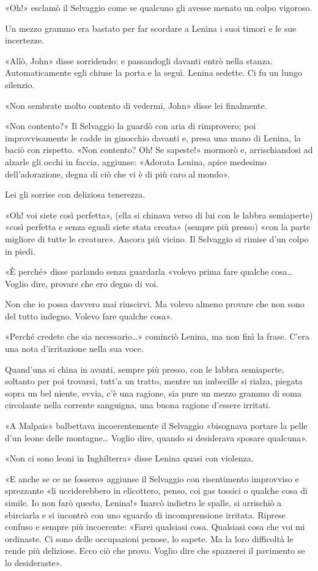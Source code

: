 \documentclass[
a5paper, %
10pt, %
twoside, 
onecolumn, %
openany, %
]{memoir}
\begin{document}
«Oh!» esclamò il Selvaggio come se qualcuno gli avesse menato un colpo vigoroso.

Un mezzo grammo era bastato per far scordare a Lenina i suoi timori e le sue incertezze.

«Allò, John» disse sorridendo; e passandogli davanti entrò nella stanza. Automaticamente egli chiuse la porta e la seguì. Lenina sedette. Ci fu un lungo silenzio.

«Non sembrate molto contento di vedermi, John» disse lei finalmente.

«Non contento?» Il Selvaggio la guardò con aria di rimprovero; poi improvvisamente le cadde in ginocchio davanti e, presa una mano di Lenina, la baciò con rispetto. «Non contento? Oh! Se sapeste!» mormorò e, arrischiandosi ad alzarle gli occhi in faccia, aggiunse: «Adorata Lenina, apice medesimo dell’adorazione, degna di ciò che vi è di più caro al mondo».

Lei gli sorrise con deliziosa tenerezza.

«Oh! voi siete così perfetta», (ella si chinava verso di lui con le labbra semiaperte) «così perfetta e senza eguali siete stata creata» (sempre più presso) «con la parte migliore di tutte le creature». Ancora più vicino. Il Selvaggio si rimise d’un colpo in piedi.

«È perché» disse parlando senza guardarla «volevo prima fare qualche cosa… Voglio dire, provare che ero degno di voi.

Non che io possa davvero mai riuscirvi. Ma volevo almeno provare che non sono del tutto indegno. Volevo fare qualche cosa».

«Perché credete che sia necessario…» cominciò Lenina, ma non finì la frase. C’era una nota d’irritazione nella sua voce.

Quand’una si china in avanti, sempre più presso, con le labbra semiaperte, soltanto per poi trovarsi, tutt’a un tratto, mentre un imbecille si rialza, piegata sopra un bel niente, evvia, c’è una ragione, sia pure un mezzo grammo di soma circolante nella corrente sanguigna, una buona ragione d’essere irritati.

«A Malpais» balbettava incoerentemente il Selvaggio «bisognava portare la pelle d’un leone delle montagne… Voglio dire, quando si desiderava sposare qualcuna».

«Non ci sono leoni in Inghilterra» disse Lenina quasi con violenza.

«E anche se ce ne fossero» aggiunse il Selvaggio con risentimento improvviso e sprezzante «li ucciderebbero in elicottero, penso, coi gas tossici o qualche cosa di simile. Io non farò questo, Lenina!» Inarcò indietro le spalle, si arrischiò a sbirciarla e si incontrò con uno sguardo di incomprensione irritata. Riprese confuso e sempre più incoerente: «Farei qualsiasi cosa. Qualsiasi cosa che voi mi ordinaste. Ci sono delle occupazioni penose, lo sapete. Ma la loro difficoltà le rende più deliziose. Ecco ciò che provo. Voglio dire che spazzerei il pavimento se lo desideraste».
\end{document}

